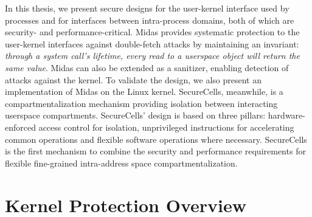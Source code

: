 In this thesis, we present secure designs 
for the user-kernel interface used by processes and 
for interfaces between intra-process domains, 
both of which are security- and performance-critical.
Midas provides systematic protection to the user-kernel interfaces against
double-fetch attacks by maintaining an invariant:
\emph{through a system call's lifetime, every read to a userspace object
will return the same value}.
Midas can also be extended as a sanitizer, enabling detection of \tocttou
attacks against the kernel.
To validate the design, we also present an implementation of Midas on the
Linux kernel.
SecureCells, meanwhile, is a compartmentalization mechanism providing isolation
between interacting userspace compartments.
SecureCells' design is based on three pillars: hardware-enforced access 
control for isolation, unprivileged instructions for accelerating common
operations and flexible software operations where necessary.
SecureCells is the first mechanism to combine the security and performance
requirements for flexible fine-grained intra-address space 
compartmentalization.


\section{Kernel \tocttou Protection Overview}

